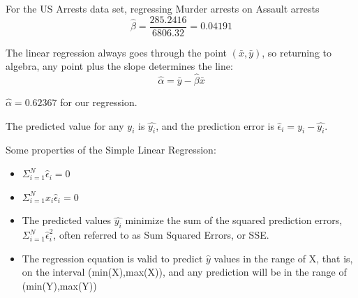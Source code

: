 \documentclass[nohyper,justified]{tufte-handout}\usepackage[]{graphicx}\usepackage[]{color}
\begin{document}
For the US Arrests data set, regressing Murder arrests on Assault arrests
\begin{equation*}
\hat{\beta}=\frac{285.2416}{6806.32}=0.04191
\end{equation*}

The linear regression always goes through the point $(\bar{x},\bar{y})$, so returning to algebra, any point plus the slope determines the line:
\begin{equation*}
\hat{\alpha}=\bar{y}-\hat{\beta}\bar{x}
\end{equation*}

$\hat{\alpha}=0.62367$ for our regression.

The predicted value for any $y_i$ is $\hat{y_i}$, and the prediction error is $\hat{\epsilon}_i=y_i - \hat{y_i}$.

Some properties of the Simple Linear Regression:
\begin{itemize}
  \item $\Sigma_{i=1}^{N} \hat{\epsilon}_i=0 $
  \item $\Sigma_{i=1}^{N} x_i \hat{\epsilon}_i=0 $
  \item The predicted values $\hat{y_i}$ minimize the sum of the squared prediction errors, $\Sigma_{i=1}^{N} \hat{\epsilon}_i^2$, often referred to as Sum Squared Errors, or SSE.
  \item The regression equation is valid to predict $\hat{y}$ values in the range of X, that is, on the interval (min(X),max(X)), and any prediction will be in the range of (min(Y),max(Y))
\end{itemize}
\end{document}
